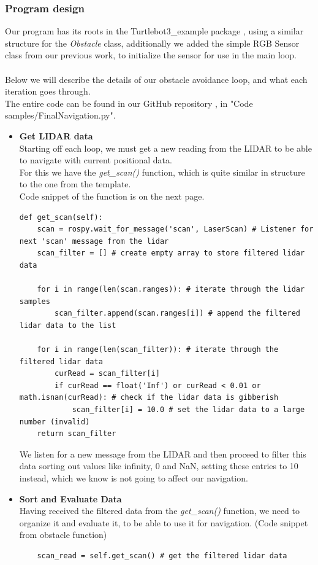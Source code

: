 \documentclass[conference]{IEEEtran}
\begin{document}
\subsubsection{Program design}\label{program}
Our program has its roots in the Turtlebot3\_example package \cite{b5}, using a similar structure for the \textit{Obstacle} class,
additionally we added the simple RGB Sensor class from our previous work, to initialize the sensor for use in the main loop.
\\\\
Below we will describe the details of our obstacle avoidance loop, and what each iteration goes through.\\
The entire code can be found in our GitHub repository \cite{b9}, in "Code samples/FinalNavigation.py".
\begin{itemize}
\item \textbf{Get LIDAR data}\\
Starting off each loop, we must get a new reading from the LIDAR to be able to navigate with current positional data.\\
For this we have the \textit{get\_scan()} function, which is quite similar in structure to the one from the template.\\
Code snippet of the function is on the next page.\\
\begin{lstlisting}
def get_scan(self):
    scan = rospy.wait_for_message('scan', LaserScan) # Listener for next 'scan' message from the lidar
    scan_filter = [] # create empty array to store filtered lidar data  

    for i in range(len(scan.ranges)): # iterate through the lidar samples
        scan_filter.append(scan.ranges[i]) # append the filtered lidar data to the list

    for i in range(len(scan_filter)): # iterate through the filtered lidar data
        curRead = scan_filter[i]
        if curRead == float('Inf') or curRead < 0.01 or math.isnan(curRead): # check if the lidar data is gibberish
            scan_filter[i] = 10.0 # set the lidar data to a large number (invalid)
    return scan_filter
\end{lstlisting}
We listen for a new message from the LIDAR and then proceed to filter this data sorting out 
values like infinity, 0 and NaN, setting these entries to 10 instead, which we know is not going to affect our navigation.\\
\item \textbf{Sort and Evaluate Data}\\
Having received the filtered data from the \textit{get\_scan()} function, we need to organize it and evaluate it,
to be able to use it for navigation. (Code snippet from obstacle function)
\begin{lstlisting}
    scan_read = self.get_scan() # get the filtered lidar data
            

\end{lstlisting}
\end{itemize}
\end{document}
